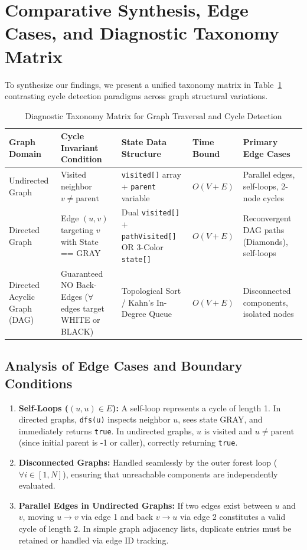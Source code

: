 \documentclass[10pt,journal,compsoc,onecolumn]{IEEEtran}
\begin{document}
\section{Comparative Synthesis, Edge Cases, and Diagnostic Taxonomy Matrix}
\label{sec:synthesis}

To synthesize our findings, we present a unified taxonomy matrix in Table~\ref{tab:taxonomy_matrix} contrasting cycle detection paradigms across graph structural variations.

\begin{table}[htbp]
\caption{Diagnostic Taxonomy Matrix for Graph Traversal and Cycle Detection}
\label{tab:taxonomy_matrix}
\centering
\begin{tabular}{p{2.2cm}p{3.2cm}p{3.2cm}p{2.2cm}p{2.5cm}}
\toprule
\textbf{Graph Domain} & \textbf{Cycle Invariant Condition} & \textbf{State Data Structure} & \textbf{Time Bound} & \textbf{Primary Edge Cases} \\
\midrule
Undirected Graph & Visited neighbor $v \neq \text{parent}$ & \texttt{visited[]} array + \texttt{parent} variable & $O(V + E)$ & Parallel edges, self-loops, 2-node cycles \\
\midrule
Directed Graph & Edge $(u, v)$ targeting $v$ with State == GRAY & Dual \texttt{visited[]} + \texttt{pathVisited[]} OR 3-Color \texttt{state[]} & $O(V + E)$ & Reconvergent DAG paths (Diamonds), self-loops \\
\midrule
Directed Acyclic Graph (DAG) & Guaranteed NO Back-Edges ($\forall$ edges target WHITE or BLACK) & Topological Sort / Kahn's In-Degree Queue & $O(V + E)$ & Disconnected components, isolated nodes \\
\bottomrule
\end{tabular}
\end{table}

\subsection{Analysis of Edge Cases and Boundary Conditions}

\begin{enumerate}
    \item \textbf{Self-Loops ($(u, u) \in E$):} A self-loop represents a cycle of length 1. In directed graphs, \texttt{dfs(u)} inspects neighbor $u$, sees state GRAY, and immediately returns \texttt{true}. In undirected graphs, $u$ is visited and $u \neq \text{parent}$ (since initial parent is -1 or caller), correctly returning \texttt{true}.
    \item \textbf{Disconnected Graphs:} Handled seamlessly by the outer forest loop ($\forall i \in [1, N]$), ensuring that unreachable components are independently evaluated.
    \item \textbf{Parallel Edges in Undirected Graphs:} If two edges exist between $u$ and $v$, moving $u \to v$ via edge 1 and back $v \to u$ via edge 2 constitutes a valid cycle of length 2. In simple graph adjacency lists, duplicate entries must be retained or handled via edge ID tracking.
\end{enumerate}
\end{document}

